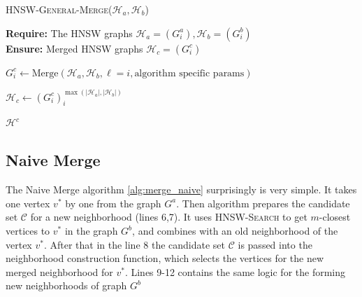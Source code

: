 \documentclass{article}
\begin{document}
\begin{algorithm}
\caption{\textsc{HNSW-General-Merge}($\mathcal{H}_a, \mathcal{H}_b$)}\label{alg:general_merge}
\textbf{Require:} The HNSW graphs $\mathcal{H}_a = (G^a_i), \mathcal{H}_b = (G^b_i)$ \\
\textbf{Ensure:}  Merged HNSW graphs $\mathcal{H}_c = (G^c_i)$ 
\begin{algorithmic}[1]

    \State $G^c_i \gets \text{Merge}(\mathcal{H}_a, \mathcal{H}_b, \ell=i, \text{algorithm specific params})$
\EndFor

\State $\mathcal{H}_c \gets (G^c_i)_i^{\max(|\mathcal{H}_a|, |\mathcal{H}_b|)}$

\State \Return $\mathcal{H}^c$
\end{algorithmic}
\end{algorithm}

\subsection{Naive Merge}
The Naive Merge algorithm \ref{alg:merge_naive} surprisingly is very simple. It takes one vertex $v^*$ by one from the graph $G^a$. Then algorithm prepares the candidate set $\mathcal{C}$ for a new neighborhood (lines 6,7). It uses \textsc{HNSW-Search} to get $m$-closest vertices to $v^*$ in the graph $G^b$, and combines with an old neighborhood of the vertex $v^*$. After that in the line 8 the candidate set $\mathcal{C}$ is passed into the neighborhood construction function, which selects the vertices for the new merged neighborhood for $v^*$.
Lines 9-12 contains the same logic for the forming new neighborhoods of graph $G^b$
\end{document}
